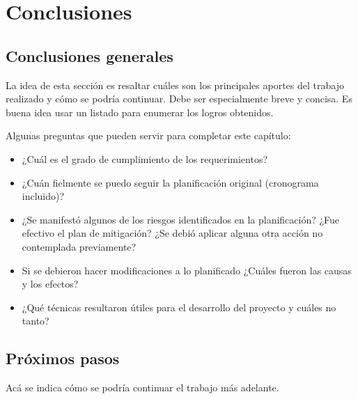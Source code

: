 
\chapter{Conclusiones} %

\label{Chapter5} %




\section{Conclusiones generales }

La idea de esta sección es resaltar cuáles son los principales aportes del trabajo realizado y cómo se podría continuar. Debe ser especialmente breve y concisa. Es buena idea usar un listado para enumerar los logros obtenidos.

Algunas preguntas que pueden servir para completar este capítulo:

\begin{itemize}
\item ¿Cuál es el grado de cumplimiento de los requerimientos?
\item ¿Cuán fielmente se puedo seguir la planificación original (cronograma incluido)?
\item ¿Se manifestó algunos de los riesgos identificados en la planificación? ¿Fue efectivo el plan de mitigación? ¿Se debió aplicar alguna otra acción no contemplada previamente?
\item Si se debieron hacer modificaciones a lo planificado ¿Cuáles fueron las causas y los efectos?
\item ¿Qué técnicas resultaron útiles para el desarrollo del proyecto y cuáles no tanto?
\end{itemize}


\section{Próximos pasos}

Acá se indica cómo se podría continuar el trabajo más adelante.
